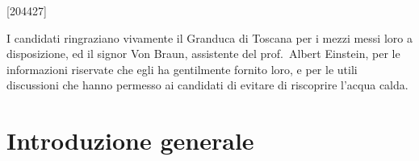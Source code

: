 \documentclass[%
corpo=11pt,
twoside,
 stile=classica,
oldstyle,
greek,%
]{toptesi}
\begin{document}



\begin{frontespizio}
\nomeateneo{}%
\FacoltaDi{}%
\facolta[III]{}%
\renewcommand*\IDlabel{\\\quad matricola: }%
[204427]%
\end{frontespizio}



\ringraziamenti %

I candidati ringraziano vivamente il Granduca di Toscana per i mezzi
messi loro a disposizione, ed il signor Von Braun, assistente del
prof.~Albert Einstein, per le informazioni riservate che egli ha
gentilmente fornito loro, e per le utili discussioni che hanno permesso
ai candidati di evitare di riscoprire l'acqua calda.



\mainmatter

\chapter{Introduzione generale}
\end{document}
